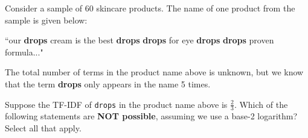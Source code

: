 \documentclass[twoside,12pt]{article}
\begin{document}
\begin{probset}
\begin{prob}
\begin{subprobset}
\begin{subprob}
\inlineresponsebox[1.25in]{}


\end{subprob}

\end{subprobset}

\end{prob}

\newpage

\begin{prob}

Consider a sample of 60 skincare products. The name of one product from the sample is given below:

\begin{center}
``our \textbf{drops} cream is the best \textbf{drops} \textbf{drops} for eye \textbf{drops} \textbf{drops} proven formula..."
\end{center}

The total number of terms in the product name above is unknown, but we know that the term \textbf{drops} only appears in the name 5 times.

\vspace{0.1in}

Suppose the TF-IDF of \texttt{drops} in the product name above is $\frac{2}{3}$. Which of the following statements are \textbf{NOT possible}, assuming we use a base-2 logarithm? Select all that apply.

\vspace{0.1in}






\end{prob}

\vspace{0.2in}

\newpage


\end{probset}
\end{document}
